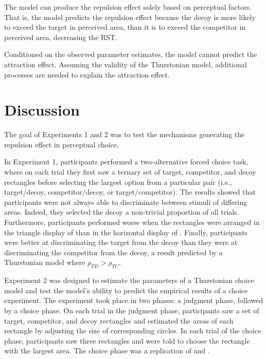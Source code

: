 The model can produce the repulsion effect solely based on perceptual factors. That is, the model predicts the repulsion effect because the decoy is more likely to exceed the target in perceived area, than it is to exceed the competitor in perceived area, decreasing the RST.

Conditioned on the observed parameter estimates, the model cannot predict the attraction effect. Assuming the validity of the Thurstonian model, additional processes are needed to explain the attraction effect.

\section{Discussion}

The goal of Experiments 1 and 2 was to test the mechanisms generating the repulsion effect in perceptual choice. 

In Experiment 1, participants performed a two-alternative forced choice task, where on each trial they first saw a ternary set of target, competitor, and decoy rectangles before selecting the largest option from a particular pair (i.e., target/decoy, competitor/decoy, or target/competitor). The results showed that participants were not always able to discriminate between stimuli of differing areas. Indeed, they selected the decoy a non-trivial proportion of all trials. Furthermore, participants performed worse when the rectangles were arranged in the triangle display of \textcite{spektorWhenGoodLooks2018b} than in the horizontal display of \textcite{trueblood2013not}. Finally, participants were better at discriminating the target from the decoy than they were at discriminating the competitor from the decoy, a result predicted by a Thurstonian model where $\rho_{TD}>\rho_{TC}$.

Experiment 2 was designed to estimate the parameters of a Thurstonian choice model and test the model's ability to predict the empirical results of a choice experiment. The experiment took place in two phases: a judgment phase, followed by a choice phase. On each trial in the judgment phase, participants saw a set of target, competitor, and decoy rectangles and estimated the areas of each rectangle by adjusting the size of corresponding circles. In each trial of the choice phase, participants saw three rectangles and were told to choose the rectangle with the largest area. The choice phase was a replication of \textcite{trueblood2013not} and \textcite{spektorWhenGoodLooks2018b}. 

